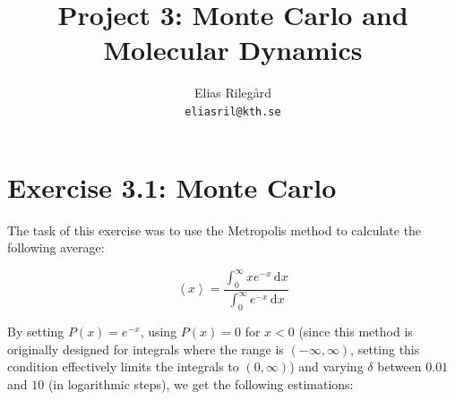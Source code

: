 \documentclass[a4paper,12pt]{article}
\title{Project 3: Monte Carlo and Molecular Dynamics}
\author{
  Elias Rilegård\\
  \texttt{eliasril@kth.se}
}
\begin{document}
\maketitle

\section*{Exercise 3.1: Monte Carlo}

The task of this exercise was to use the Metropolis method to calculate the following average:

$$
  \left\langle x \right\rangle = \frac{
    \displaystyle \int_{0}^{\infty} x e^{-x} \,\mathrm{d}x
  }{
    \displaystyle \int_{0}^{\infty} e^{-x} \,\mathrm{d}x
  }
$$

By setting $P(x) = e^{-x}$, using $P(x) = 0$ for $x < 0$ (since this method is originally designed for integrals
where the range is $(-\infty, \infty)$, setting this condition effectively limits the integrals to $(0, \infty)$)
and varying $\delta$ between $0.01$ and $10$ (in logarithmic steps), we get the following estimations:
\end{document}
